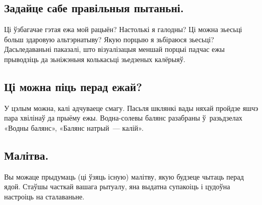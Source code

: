 
\subsection{Задайце сабе правільныя пытаньні.}
Ці ўзбагачае гэтая ежа мой рацыён? Настолькі я галодны? Ці можна зьесьці больш здаровую альтэрнатыву? Якую порцыю я зьбіраюся зьесьці? Дасьледаваньні паказалі, што візуалізацыя меншай порцыі падчас ежы прыводзіць да зьніжэньня колькасьці зьедзеных калёрыяў.

\subsection{Ці можна піць перад ежай?}
У цэлым можна, калі адчуваеце смагу. Пасьля шклянкі вады няхай пройдзе яшчэ пара хвілінаў да прыёму ежы. Водна-солевы балянс разабраны ў~разьдзелах «Водны балянс», «Балянс натрый~--- калій».


\subsection{Малітва.}
Вы можаце прыдумаць (ці ўзяць існую) малітву, якую будзеце чытаць перад ядой. Стаўшы часткай вашага рытуалу, яна выдатна супакоіць і цудоўна настроіць на сталаваньне.
